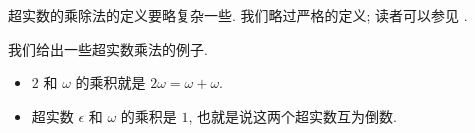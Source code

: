 超实数的乘除法的定义要略复杂一些. %
我们略过严格的定义; 读者可以参见 \cite{Gon86}.

  
 
  

 
  
  
  
\begin{example}
我们给出一些超实数乘法的例子.
\begin{itemize}
    \item $2$ 和 $\omega$ 的乘积就是 $2\omega = \omega + \omega$.
    \item 超实数 $\epsilon$ 和 $\omega$ 的乘积是 $1$, 
    也就是说这两个超实数互为倒数.
\end{itemize}
\end{example}

